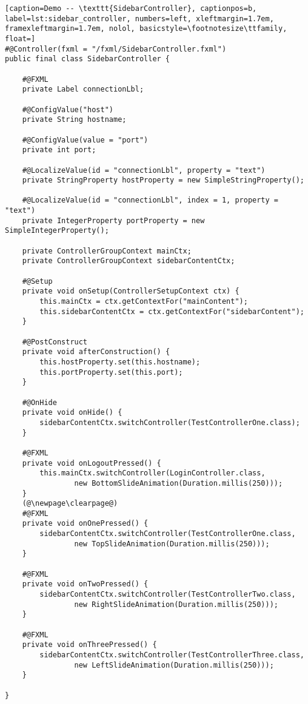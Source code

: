 	\begin{lstlisting}[caption=Demo -- \texttt{SidebarController}, captionpos=b, label=lst:sidebar_controller, numbers=left, xleftmargin=1.7em, framexleftmargin=1.7em, nolol, basicstyle=\footnotesize\ttfamily, float=]
#@Controller(fxml = "/fxml/SidebarController.fxml")
public final class SidebarController {

    #@FXML
    private Label connectionLbl;

    #@ConfigValue("host")
    private String hostname;

    #@ConfigValue(value = "port")
    private int port;

    #@LocalizeValue(id = "connectionLbl", property = "text")
    private StringProperty hostProperty = new SimpleStringProperty();

    #@LocalizeValue(id = "connectionLbl", index = 1, property = "text")
    private IntegerProperty portProperty = new SimpleIntegerProperty();

    private ControllerGroupContext mainCtx;
    private ControllerGroupContext sidebarContentCtx;

    #@Setup
    private void onSetup(ControllerSetupContext ctx) {
        this.mainCtx = ctx.getContextFor("mainContent");
        this.sidebarContentCtx = ctx.getContextFor("sidebarContent");
    }

    #@PostConstruct
    private void afterConstruction() {
        this.hostProperty.set(this.hostname);
        this.portProperty.set(this.port);
    }

    #@OnHide
    private void onHide() {
        sidebarContentCtx.switchController(TestControllerOne.class);
    }

    #@FXML
    private void onLogoutPressed() {
        this.mainCtx.switchController(LoginController.class, 
				new BottomSlideAnimation(Duration.millis(250)));
    }
	(@\newpage\clearpage@)
    #@FXML
    private void onOnePressed() {
        sidebarContentCtx.switchController(TestControllerOne.class, 
				new TopSlideAnimation(Duration.millis(250)));
    }

    #@FXML
    private void onTwoPressed() {
        sidebarContentCtx.switchController(TestControllerTwo.class,
				new RightSlideAnimation(Duration.millis(250)));
    }

    #@FXML
    private void onThreePressed() {
        sidebarContentCtx.switchController(TestControllerThree.class, 
				new LeftSlideAnimation(Duration.millis(250)));
    }

}
	\end{lstlisting}
